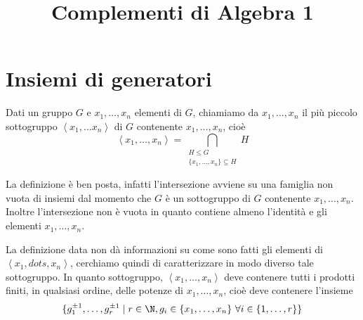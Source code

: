 \documentclass[11pt]{scrartcl}
\begin{document}
\title{Complementi di Algebra 1}
\maketitle
\newpage

\tableofcontents
\eject

\newpage

\section{Insiemi di generatori}

\begin{definition}
    Dati un gruppo $G$ e $x_1, \dots, x_n$ elementi di $G$, chiamiamo  da $x_1, \dots, x_n$ il più piccolo sottogruppo $\left< x_1, \dots x_n
    \right>$ di $G$ contenente $x_1, \dots, x_n$, cioè \[\left<x_1, \dots, x_n\right> =
    \bigcap_{\substack{H\leq G\\ \{x_1, \dots, x_n\} \subseteq H}} H\] 
\end{definition}

\begin{remark}
    La definizione è ben posta, infatti l'intersezione avviene su una 
    famiglia non vuota di insiemi dal momento che $G$ è un sottogruppo di 
    $G$ contenente $x_1, \dots, x_n$. Inoltre l'intersezione non è vuota in 
    quanto contiene almeno l'identità e gli elementi $x_1, \dots, x_n$.
\end{remark}

La definizione data non dà informazioni su come sono fatti gli elementi di 
$\left<x_1, dots, x_n\right>$, cerchiamo quindi di caratterizzare in modo
diverso tale sottogruppo. In quanto sottogruppo, $\left<x_1, \dots, x_n\right>$
deve contenere tutti i prodotti finiti, in qualsiasi ordine, delle potenze di
$x_1, \dots, x_n$, cioè deve contenere l'insieme 
\[\{g_1^{\pm 1}, \dots, g_r^{\pm 1}\mid r \in \N, g_i \in \{x_1, \dots, x_n\}
~\forall i \in \{1, \dots, r\}\}\]
\end{document}
